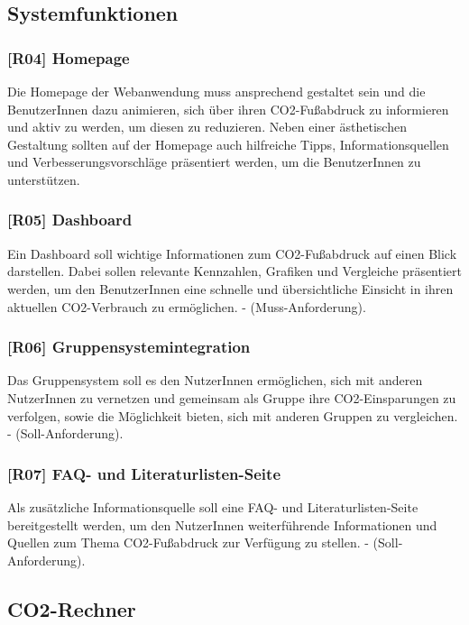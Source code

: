 \subsection{Systemfunktionen}

\subsubsection{[R04] Homepage}

Die Homepage der Webanwendung muss ansprechend gestaltet sein und die BenutzerInnen dazu animieren, sich über ihren CO2-Fußabdruck zu informieren und aktiv zu werden, um diesen zu reduzieren. Neben einer ästhetischen Gestaltung sollten auf der Homepage auch hilfreiche Tipps, Informationsquellen und Verbesserungsvorschläge präsentiert werden, um die BenutzerInnen zu unterstützen.

\subsubsection{[R05] Dashboard}

Ein Dashboard soll wichtige Informationen zum CO2-Fußabdruck auf einen Blick darstellen. Dabei sollen relevante Kennzahlen, Grafiken und Vergleiche präsentiert werden, um den BenutzerInnen eine schnelle und übersichtliche Einsicht in ihren aktuellen CO2-Verbrauch zu ermöglichen. - (Muss-Anforderung).

\subsubsection{[R06] Gruppensystemintegration}

Das Gruppensystem soll es den NutzerInnen ermöglichen, sich mit anderen NutzerInnen zu vernetzen und gemeinsam als Gruppe ihre CO2-Einsparungen zu verfolgen, sowie die Möglichkeit bieten, sich mit anderen Gruppen zu vergleichen. - (Soll-Anforderung).

\subsubsection{[R07] FAQ- und Literaturlisten-Seite}

Als zusätzliche Informationsquelle soll eine FAQ- und Literaturlisten-Seite bereitgestellt werden, um den NutzerInnen weiterführende Informationen und Quellen zum Thema CO2-Fußabdruck zur Verfügung zu stellen. - (Soll-Anforderung).

\subsection{CO2-Rechner}

